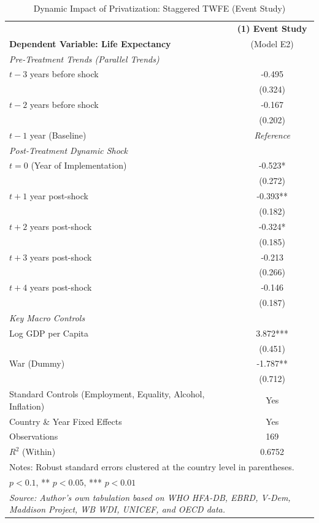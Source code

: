 \documentclass[12pt]{article}
\begin{document}
\begin{table}[H]
\centering
\caption{Dynamic Impact of Privatization: Staggered TWFE (Event Study)}
\label{tab:event_study}
\footnotesize
\begin{tabular}{l c}
\toprule
 & \textbf{(1) Event Study} \\
\textbf{Dependent Variable: Life Expectancy} & (Model E2) \\
\midrule
\textit{Pre-Treatment Trends (Parallel Trends)} & \\
$t-3$ years before shock & -0.495 \\
 & (0.324) \\
$t-2$ years before shock & -0.167 \\
 & (0.202) \\
$t-1$ year (Baseline) & \textit{Reference} \\
\midrule
\textit{Post-Treatment Dynamic Shock} & \\
$t=0$ (Year of Implementation) & -0.523* \\
 & (0.272) \\
$t+1$ year post-shock & -0.393** \\
 & (0.182) \\
$t+2$ years post-shock & -0.324* \\
 & (0.185) \\
$t+3$ years post-shock & -0.213 \\
 & (0.266) \\
$t+4$ years post-shock & -0.146 \\
 & (0.187) \\
\midrule
\textit{Key Macro Controls} & \\
Log GDP per Capita & 3.872*** \\
 & (0.451) \\
War (Dummy) & -1.787** \\
 & (0.712) \\
\midrule
Standard Controls (Employment, Equality, Alcohol, Inflation) & Yes \\
Country \& Year Fixed Effects & Yes \\
Observations & 169 \\
$R^2$ (Within) & 0.6752 \\
\bottomrule
\multicolumn{2}{l}{\scriptsize Notes: Robust standard errors clustered at the country level in parentheses.} \\
\multicolumn{2}{l}{\scriptsize * $p < 0.1$, ** $p < 0.05$, *** $p < 0.01$} \\
\multicolumn{2}{l}{\scriptsize \textit{Source: Author's own tabulation based on WHO HFA-DB, EBRD, V-Dem, Maddison Project, WB WDI, UNICEF, and OECD data.}} \\
\end{tabular}
\end{table}
\end{document}
